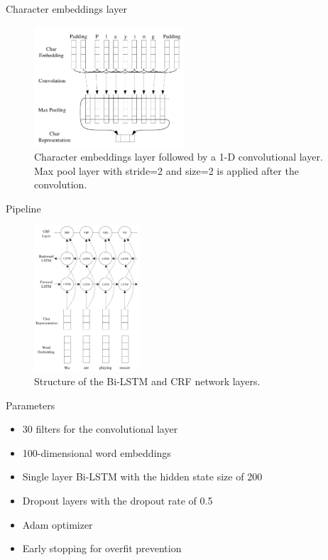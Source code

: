 \documentclass{beamer}
\begin{document}
\begin{frame}{Character embeddings layer}
    \begin{figure}
      \caption{Character embeddings layer followed by a 1-D convolutional layer.
      Max pool layer with stride=2 and size=2 is applied after the convolution.}
      \label{fig:cnn_embed}
      \centering
        \includegraphics[width=0.5\textwidth]{imgs/cnn_embed.png}
    \end{figure}

\end{frame}

\begin{frame}{Pipeline}
    \begin{figure}
      \caption{Structure of the Bi-LSTM and CRF network layers.}
      \label{fig:pipeline}
      \centering
        \includegraphics[width=0.35\textwidth]{imgs/pipeline.png}
    \end{figure}
\end{frame}

\begin{frame}{Parameters}
    \begin{itemize}
        \item{
            30 filters for the convolutional layer
            }
        \item{
             100-dimensional word embeddings
            }
        \item{
            Single layer Bi-LSTM with the hidden state size of 200
            }
        \item{
            Dropout layers with the dropout rate of 0.5
        }
        \item{
            Adam optimizer
        }
        \item{
            Early stopping for overfit prevention
        }
  \end{itemize}
\end{frame}
\end{document}
